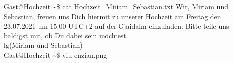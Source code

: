 \documentclass[12pt, a5paper]{article}
\begin{document}
\noindent
{\selectfont
\lbrack Gast@Hochzeit \textasciitilde\rbrack\$ cat Hochzeit\_Miriam\_Sebastian.txt
Wir, Miriam und Sebastian, freuen uns Dich hiermit zu unserer Hochzeit am Freitag den 23.07.2021 um 15:00 UTC+2 auf der Gjaidalm einzuladen. Bitte teile uns baldigst mit, ob Du dabei sein möchtest.\\ lg(Miriam und Sebastian) \\
\lbrack Gast@Hochzeit \textasciitilde\rbrack\$ viu enzian.png\\
\vspace*{-40px}
\begin{figure}[H]
\end{figure}
}
\end{document}
